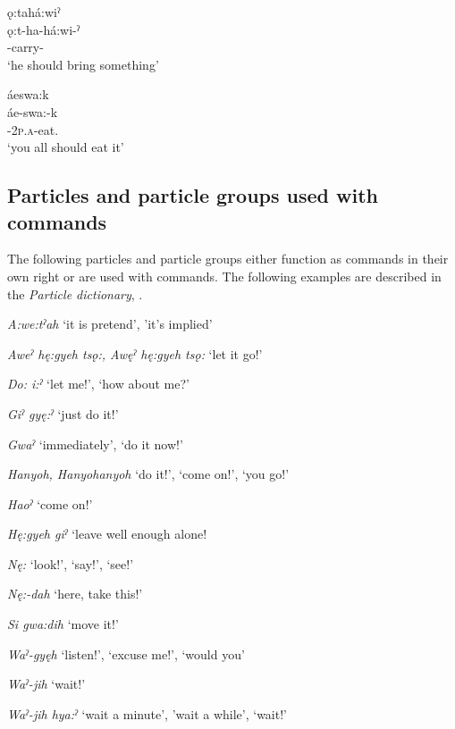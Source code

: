 \ex ǫ:tahá:wiˀ\\
\gll ǫ:t-ha-há:wi-ˀ\\
 {\indefinitecislocative}-carry-{\punctual}\\
\glt `he should bring something'

\ex áeswa:k\\
\gll áe-swa:-k\\
 {\indefinite}-\textsc{2p.a}-eat.{\zeropunctual}\\
\glt `you all should eat it'
\z
\z

\subsection{Particles and particle groups used with commands} \label{Particles and particle groups used with commands}
The following particles and particle groups either function as commands in their own right or are used with commands. The following examples are described in the \textit{Particle dictionary}, .

\begin{CayugaRelated}
\item{}\textit{A:we:tˀah} ‘it is pretend’, 'it's implied’\\
\item{}\textit{Aweˀ hę:gyeh tsǫ:, Awęˀ hę:gyeh tsǫ:} ‘let it go!’\\
\item{}\textit{Do: i:ˀ} ‘let me!’, ‘how about me?’\\
\item{}\textit{Giˀ gyę:ˀ} ‘just do it!’\\
\item{}\textit{Gwaˀ} ‘immediately’, ‘do it now!’\\
\item{}\textit{Hanyoh, Hanyohanyoh} ‘do it!’, ‘come on!’, ‘you go!’\\
\item{}\textit{Haoˀ} ‘come on!’\\
\item{}\textit{Hę:gyeh giˀ} ‘leave well enough alone!\\
\item{}\textit{Nę:} ‘look!’, ‘say!’, ‘see!’\\
\item{}\textit{Nę:-dah} ‘here, take this!’\\
\item{}\textit{Si gwa:dih} ‘move it!’\\
\item{}\textit{Waˀ-gyęh} ‘listen!’, ‘excuse me!’, ‘would you’\\
\item{}\textit{Waˀ-jih} ‘wait!’\\
\item{}\textit{Waˀ-jih hya:ˀ} ‘wait a minute’, 'wait a while’, ‘wait!’
\end{CayugaRelated}

